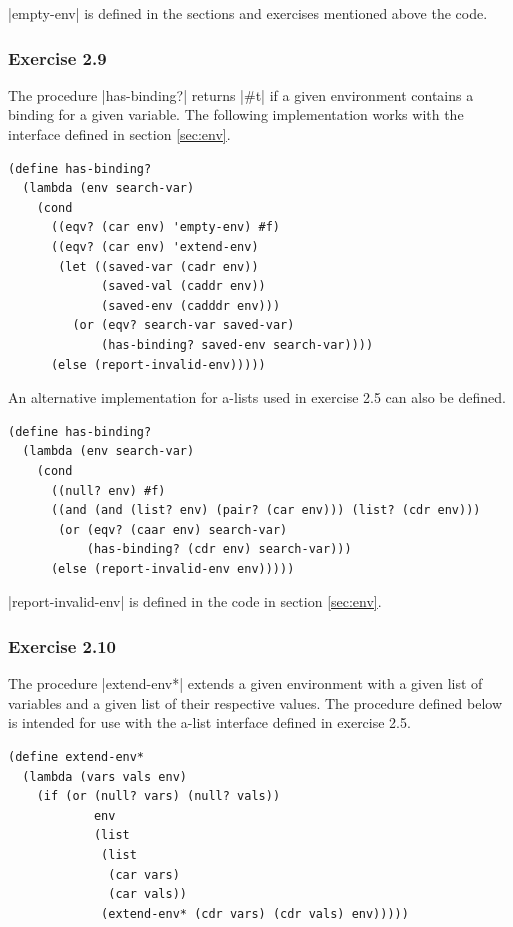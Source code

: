 \documentclass[a4paper]{article}
\begin{document}
|empty-env| is defined in the sections and exercises mentioned above the code.

\subsubsection{Exercise 2.9}

The procedure |has-binding?| returns |#t| if a given environment contains a binding for a given variable. The following implementation works with the interface defined in section \ref{sec:env}.

\begin{lstlisting}
(define has-binding?
  (lambda (env search-var)
    (cond
      ((eqv? (car env) 'empty-env) #f)
      ((eqv? (car env) 'extend-env)
       (let ((saved-var (cadr env))
             (saved-val (caddr env))
             (saved-env (cadddr env)))
         (or (eqv? search-var saved-var)
             (has-binding? saved-env search-var))))
      (else (report-invalid-env)))))
\end{lstlisting}

An alternative implementation for a-lists used in exercise 2.5 can also be defined.

\begin{lstlisting}
(define has-binding?
  (lambda (env search-var)
    (cond
      ((null? env) #f)
      ((and (and (list? env) (pair? (car env))) (list? (cdr env)))
       (or (eqv? (caar env) search-var)
           (has-binding? (cdr env) search-var)))
      (else (report-invalid-env env)))))
\end{lstlisting}

|report-invalid-env| is defined in the code in section \ref{sec:env}.

\subsubsection{Exercise 2.10}

The procedure |extend-env*| extends a given environment with a given list of variables and a given list of their respective values. The procedure defined below is intended for use with the a-list interface defined in exercise 2.5.

\begin{lstlisting}
(define extend-env*
  (lambda (vars vals env)
    (if (or (null? vars) (null? vals))
            env
            (list
             (list
              (car vars)
              (car vals))
             (extend-env* (cdr vars) (cdr vals) env)))))
\end{lstlisting}
\end{document}
